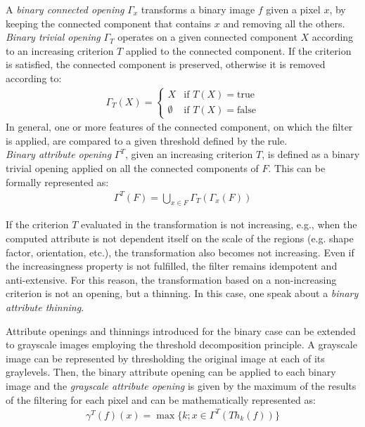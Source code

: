 \noindent A {\it binary connected opening} $\Gamma_x$ transforms a binary image $f$ given a pixel $x$, by keeping the connected component that contains $x$ and removing all the others.\\
{\it Binary trivial opening} $\Gamma_T$ operates on a given connected component $X$ according to an increasing criterion $T$ applied to the connected component. If the criterion is satisfied, the connected component is preserved, otherwise it is removed according to:\vspace*{-2pt}
\begin{eqnarray}
\Gamma_T(X)=\left\{
\begin{array}{cc}
X & \text{if } T(X)=\text{true}\\
\emptyset & \text{if } T(X)=\text{false}
\end{array}
\right.
\end{eqnarray}
In general, one or more features of the connected component, on which the filter is applied, are compared to a given threshold defined by the rule.\\
{\it Binary attribute opening} $\Gamma^T$, given an increasing criterion $T$, is defined as a binary trivial opening applied on all the connected components of $F$. This can be formally represented as:\vspace*{-8pt}
\begin{eqnarray}
\Gamma^T(F)=\bigcup_{x\in F}\Gamma_T(\Gamma_x(F))
\end{eqnarray}

If the criterion $T$ evaluated in the transformation is not increasing, e.g., when the computed attribute is not dependent itself on the scale of the regions (e.g. shape factor, orientation, etc.), the transformation also becomes not increasing. Even if the increasingness property is not fulfilled, the filter remains idempotent and anti-extensive. For this reason, the transformation based on a non-increasing criterion is not an opening, but a thinning. In this case, one speak about a {\it binary attribute thinning}.

Attribute openings and thinnings introduced for the binary case can be extended to grayscale images employing the threshold decomposition principle. A grayscale image can be represented by thresholding the original image at each of its graylevels. Then, the binary attribute opening can be applied to each binary image and the {\it grayscale attribute opening} is given by the maximum of the results of the filtering for each pixel and can be mathematically represented as:\vspace*{-3pt}
\begin{eqnarray}
\gamma^T(f)(x)=\max\{k; x\in \Gamma^T(Th_k(f))\}
\end{eqnarray}
\vspace*{-3pt}\vspace*{-\baselineskip}

